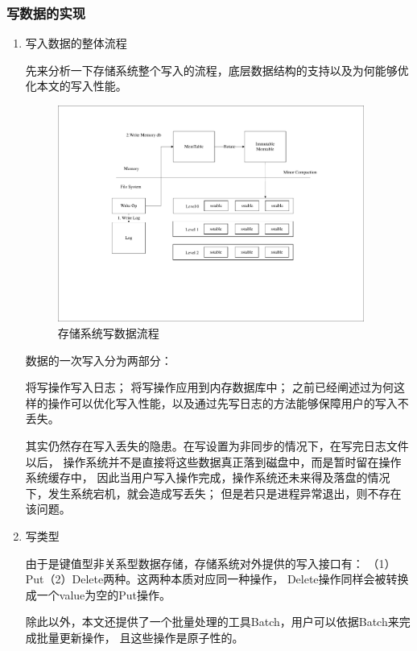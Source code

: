 		\subsubsection{写数据的实现}
		
		\begin{enumerate}
		\item 写入数据的整体流程
			
		先来分析一下存储系统整个写入的流程，底层数据结构的支持以及为何能够优化本文的写入性能。
		
		\begin{figure}[H]
			\centering
			\includegraphics[width=0.95\textwidth]{pdf/write_op.pdf}
			\caption{存储系统写数据流程}
			\label{write_op}
		\end{figure}

		数据的一次写入分为两部分：

		将写操作写入日志；
		将写操作应用到内存数据库中；
		之前已经阐述过为何这样的操作可以优化写入性能，以及通过先写日志的方法能够保障用户的写入不丢失。

		其实仍然存在写入丢失的隐患。在写设置为非同步的情况下，在写完日志文件以后，
		操作系统并不是直接将这些数据真正落到磁盘中，而是暂时留在操作系统缓存中，
		因此当用户写入操作完成，操作系统还未来得及落盘的情况下，发生系统宕机，就会造成写丢失；
		但是若只是进程异常退出，则不存在该问题。

		\item 写类型
		
		由于是键值型非关系型数据存储，存储系统对外提供的写入接口有：
		（1）Put（2）Delete两种。这两种本质对应同一种操作，
		Delete操作同样会被转换成一个value为空的Put操作。
	
		除此以外，本文还提供了一个批量处理的工具Batch，用户可以依据Batch来完成批量更新操作，
		且这些操作是原子性的。


\end{enumerate}

